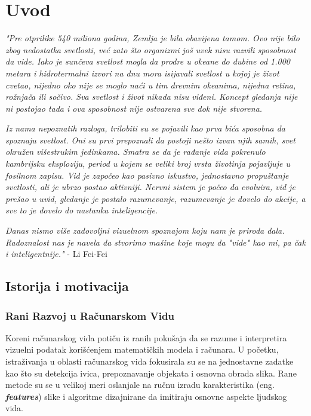 \documentclass[12pt]{article}
\begin{document}
   \section{Uvod}
   
   \textit{"Pre otprilike 540 miliona godina, 
   Zemlja je bila obavijena tamom.
   Ovo nije bilo zbog nedostatka svetlosti,
   već zato što organizmi još uvek nisu razvili sposobnost da vide.
   Iako je sunčeva svetlost mogla da prodre u okeane do dubine
   od 1.000 metara i hidrotermalni izvori na dnu mora isijavali 
   svetlost u kojoj je život cvetao, nijedno oko nije se moglo naći 
   u tim drevnim okeanima, nijedna retina, rožnjača ili sočivo. 
   Sva svetlost i život nikada nisu viđeni. Koncept gledanja nije ni postojao tada 
   i ova sposobnost nije ostvarena sve dok nije stvorena.
   }
   
   \textit{Iz nama nepoznatih razloga, trilobiti su se pojavili kao prva bića sposobna
   da spoznaju svetlost. Oni su prvi prepoznali da postoji nešto izvan
   njih samih, svet okružen višestrukim jedinkama. Smatra se da je rađanje vida pokrenulo
   kambrijsku eksploziju, period u kojem se veliki broj vrsta životinja pojavljuje u 
   fosilnom zapisu. Vid je započeo kao pasivno iskustvo, jednostavno propuštanje svetlosti, 
   ali je ubrzo postao aktivniji. Nervni sistem je počeo da evoluira, vid je prešao u uvid, 
   gledanje je postalo razumevanje, razumevanje je dovelo do akcije, a sve to je dovelo do 
   nastanka inteligencije.}
   
   \textit{Danas nismo više zadovoljni vizuelnom spoznajom koju nam je priroda dala. 
   Radoznalost nas je navela da stvorimo mašine koje mogu da "vide" kao mi, pa čak i inteligentnije."} - Li Fei-Fei \cite{li_fei_fei}
   

   \subsection{Istorija i motivacija}
   \vspace{-0.5cm}
   \subsubsection{Rani Razvoj u Računarskom Vidu}

   Koreni računarskog vida potiču iz ranih pokušaja da se razume 
   i interpretira vizuelni podatak korišćenjem matematičkih modela i računara. 
   U početku, istraživanja u oblasti računarskog vida fokusirala su se na 
   jednostavne zadatke kao što su detekcija ivica, prepoznavanje objekata i 
   osnovna obrada slika. Rane metode su se u velikoj meri oslanjale na ručnu 
   izradu karakteristika (eng. \textbf{\textit{features}}) slike i algoritme dizajnirane da imitiraju osnovne aspekte 
   ljudskog vida.
\end{document}
